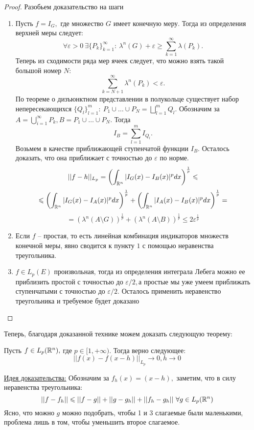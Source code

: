 \begin{proof} Разобьем доказательство на шаги

\begin{enumerate}
    \item Пусть $f = I_{G},$ где множество $G$ имеет конечную меру. Тогда из определения верхней меры следует:
    $$\forall \varepsilon > 0 \ \exists \{P_{k}\}_{k = 1}^{\infty} : \ \lambda^n(G) + \varepsilon \geq \sum_{k  =1}^{\infty}\lambda(P_k).$$
    Теперь из сходимости ряда мер ячеек следует, что можно взять такой большой номер $N:$
    $$\sum_{k = N + 1}^{\infty} \lambda^n(P_k) < \varepsilon.$$
    По теореме о дизъюнктном представлении в полукольце существует набор непересекающихся $\{Q_l\}_{l = 1}^{m}: \ P_1 \cup \ldots \cup P_N = \bigsqcup_{l = 1}^mQ_l.$ Обозначим за $A = \bigcup_{i = 1}^{\infty} P_k,  B = P_1 \cup \ldots \cup P_N.$ Тогда  
    $$I_{B} = \sum_{l = 1}^{m}I_{Q_l}.$$
    Возьмем в качестве приближающей ступенчатой функции $I_{B}.$ Осталось доказать, что она приближает с точностью до $\varepsilon$ по норме.
    $$||f - h||_{L_p} = \left( \int_{\mathbb{R}^n} |I_G(x) - I_B(x)|^p dx\right)^{\frac{1}{p}} \leqslant$$
    $$\leqslant \left( \int_{\mathbb{R}^n} |I_G(x) - I_A(x)|^p dx\right)^{\frac{1}{p}} + \left( \int_{\mathbb{R}^n} |I_A(x) - I_B(x)|^p dx\right)^{\frac{1}{p}} = $$
    $$= \left( \lambda^n(A \setminus G)\right)^{\frac{1}{p}} + \left( \lambda^n(A \setminus B) \right)^{\frac{1}{p}} \leq 2\varepsilon^{\frac{1}{p}}$$
    \item Если $f$ -- простая, то есть линейная комбинация индикаторов множеств конечной меры, явно сводится к пункту $1$ с помощью неравенства треугольника.
    \item $f \in L_p(E)$ произвольная, тогда из определения интеграла Лебега можно ее приблизить простой с точностью до $\varepsilon / 2, $а простые мы уже умеем приближать ступенчатыми с точностью до $\varepsilon / 2.$ Осталось применить неравенство треугольника и требуемое будет доказано 
\end{enumerate}
\end{proof}

Теперь, благодаря доказанной технике можем доказать следующую теорему:
\begin{theorem}
    Пусть $f \in L_p(\mathbb{R}^n), $ где $p \in [1, +\infty).$ Тогда верно следующее:
    $$||f(x) - f(x - h)||_{L_p} \rightarrow 0, h \rightarrow 0$$
\end{theorem}

\underline{Идея доказательства:} Обозначим за $f_h(x) = (x - h),$ заметим, что в силу неравенства треугольника:
$$||f - f_h|| \leqslant ||f - g|| + ||g - g_h|| + ||f_h - g_h|| \ \forall g \in L_p(\mathbb{R}^n)$$
Ясно, что можно $g$ можно подобрать, чтобы 1 и 3 слагаемые были маленькими, проблема лишь в том, чтобы уменьшить второе слагаемое.  

